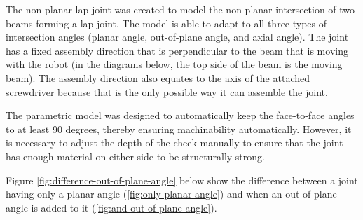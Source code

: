 The non-planar lap joint was created to model the non-planar intersection of two beams forming a lap joint. The model is able to adapt to all three types of intersection angles (planar angle, out-of-plane angle, and axial angle). The joint has a fixed assembly direction that is perpendicular to the beam that is moving with the robot (in the diagrams below, the top side of the beam is the moving beam). The assembly direction also equates to the axis of the attached screwdriver because that is the only possible way it can assemble the joint.

The parametric model was designed to automatically keep the face-to-face angles to at least 90 degrees, thereby ensuring machinability automatically. However, it is necessary to adjust the depth of the cheek manually to ensure that the joint has enough material on either side to be structurally strong.

Figure \ref{fig:difference-out-of-plane-angle} below show the difference between a joint having only a planar angle (\ref{fig:only-planar-angle}) and when an out-of-plane angle is added to it (\ref{fig:and-out-of-plane-angle}).

